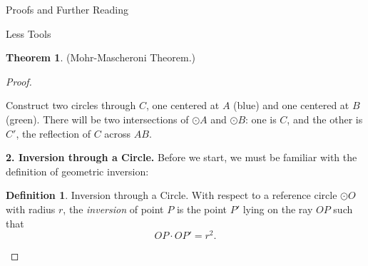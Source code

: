 \documentclass[12pt]{article}
\theoremstyle{definition}
\newtheorem{definition}{Definition}[section]
\theoremstyle{definition}
\theoremstyle{definition}
\newtheorem{theorem}{Theorem}[section]
\theoremstyle{definition}
\theoremstyle{definition}
\theoremstyle{definition}
\theoremstyle{definition}
\begin{document}
\begin{section}{Proofs and Further Reading}
\begin{subsection}{Less Tools}
\begin{theorem}{(Mohr-Mascheroni Theorem.)}
\begin{proof}
\begin{figure}[H]
                \end{figure}
                Construct two circles through \(C\), one centered at \(A\) (blue) and one centered at \(B\) (green). There will be two intersections of 
                \(\odot A\) and \(\odot B\): one is \(C\), and the other is \(C'\), the reflection of \(C\) across \(AB\).\\
                \break


                \noindent\textbf{2. Inversion through a Circle.} Before we start, we must be familiar with the definition of geometric inversion:
                \begin{definition}{Inversion through a Circle.}
                    With respect to a reference circle \(\odot O\) with radius \(r\), the \textit{inversion} of point \(P\) is the point \(P'\) lying on the ray \(OP\) such that 
                    \[OP \cdot OP' = r^2.\]
                    \begin{figure}[H]
                        \centering
\end{figure}
\end{definition}
\end{proof}
\end{theorem}
\end{subsection}
\end{section}
\end{document}
